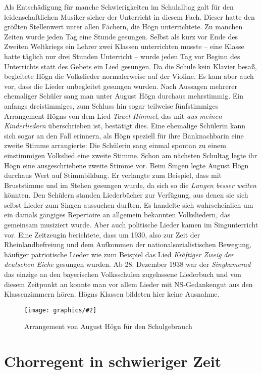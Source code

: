 \documentclass{book}
\newcommand{\zitat}[1]{\textit{#1}}
\newcommand{\img}[2][width=\linewidth]{\noindent\texttt{[image: graphics/\#2]}}
\begin{document}
Als Entschädigung für manche Schwierigkeiten im Schulalltag galt für den
leidenschaftlichen Musiker sicher der Unterricht in diesem Fach. Dieser
hatte den größten Stellenwert unter allen Fächern, die Högn
unterrichtete. Zu manchen Zeiten wurde jeden Tag eine Stunde
gesungen. Selbst als kurz vor Ende des Zweiten Weltkriegs ein Lehrer
zwei Klassen unterrichten musste – eine Klasse hatte täglich nur drei
Stunden Unterricht – wurde jeden Tag vor Beginn des Unterrichts statt
des Gebets ein Lied gesungen. Da die Schule kein Klavier besaß,
begleitete Högn die Volkslieder normalerweise auf der Violine. Es kam
aber auch vor, dass die Lieder unbegleitet gesungen wurden. Nach
Aussagen mehrerer ehemaliger Schüler sang man unter August Högn
durchaus mehrstimmig. Ein anfangs dreistimmiges, zum Schluss hin
sogar teilweise fünfstimmiges Arrangement Högns von dem Lied
\textit{Tauet Himmel}, das mit \textit{aus meinen Kinderliedern}
überschrieben ist, bestätigt dies. Eine ehemalige Schülerin kann sich
sogar an den Fall erinnern, als Högn speziell für ihre Banknachbarin
eine zweite Stimme arrangierte: Die Schülerin sang einmal spontan zu
einem einstimmigen Volkslied eine zweite Stimme. Schon am nächsten
Schultag legte ihr Högn eine ausgeschriebene zweite Stimme vor. Beim
Singen legte August Högn durchaus Wert auf Stimmbildung. Er verlangte
zum Beispiel, dass mit Bruststimme und im Stehen gesungen wurde, da
sich so die \zitat{Lungen besser weiten} könnten. Den
Schülern standen Liederbücher zur Verfügung, aus denen sie sich selbst
Lieder zum Singen aussuchen durften. Es handelte sich wahrscheinlich
um ein damals gängiges Repertoire an allgemein bekannten
Volksliedern, das gemeinsam musiziert wurde. Aber auch politische
Lieder kamen im Singunterricht vor. Eine Zeitzeugin berichtete, dass um
1930, also zur Zeit der Rheinlandbefreiung und dem Aufkommen der
nationalsozialistischen Bewegung, häufiger patriotische Lieder wie zum
Beispiel das Lied \textit{Kräftiger Zweig} \textit{der deutschen Eiche}
gesungen wurden. Ab 28. Dezember 1938 war der \textit{Singkamerad}
das einzige an den bayerischen Volksschulen zugelassene Liederbuch und
von diesem Zeitpunkt an konnte man vor allem Lieder mit
NS-Gedankengut aus den Klassenzimmern hören. Högns Klassen bildeten
hier keine Ausnahme.

\begin{figure}
\img{Arrangement-fuer-Schulgebrauch}
\caption{Arrangement von August Högn für den Schulgebrauch}
\end{figure}

\section{Chorregent in schwieriger Zeit}
\end{document}
